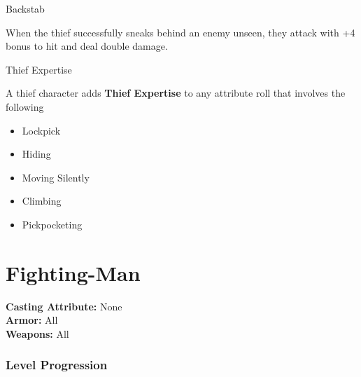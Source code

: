 \documentclass[18pt]{article}
\begin{document}
\begin{multicols}{2} %

\begin{mercHeading}
Backstab 
\end{mercHeading}
When the thief successfully sneaks behind an enemy unseen, they attack with +4 bonus to hit and deal double damage.

\begin{mercHeading}
Thief Expertise
\end{mercHeading}
A thief character adds \textbf{Thief Expertise} to any attribute roll that involves the following
\begin{itemize}
	\setlength\itemsep{0em}
	\item Lockpick
	\item Hiding
	\item Moving Silently
	\item Climbing
	\item Pickpocketing
	
\end{itemize}

\end{multicols}

\section*{Fighting-Man}%
\begin{multicols}{3}
\begin{mercClassInfo}
\textbf{Casting Attribute:} None\\
\textbf{Armor:} All\\
\textbf{Weapons:} All
\end{mercClassInfo}
\end{multicols}

\subsubsection*{Level Progression}
\vspace{-10pt}
\end{document}
